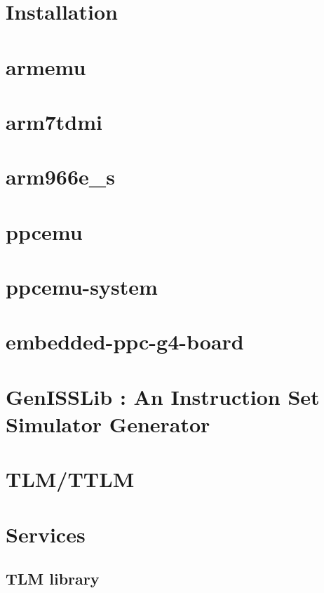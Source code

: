 \documentclass[a4paper,11pt,onecolumn]{mathese}
\begin{document}
\chapter{Installation}
\label{installation}


\chapter{armemu}
\label{armemu}


\chapter{arm7tdmi}
\label{arm7tdmi}


\chapter{arm966e\_s}
\label{arm966e_s}


\chapter{ppcemu}
\label{ppcemu}


\chapter{ppcemu-system}
\label{ppcemu_system}


\chapter{embedded-ppc-g4-board}
\label{embedded_ppc_g4_board}


\chapter{GenISSLib : An Instruction Set Simulator Generator}
\label{genisslib}


\chapter{TLM/TTLM}
\label{tlm_ttlm}


\chapter{Services}
\label{services}


\begin{appendix}
\chapter{TLM library}
\label{tlm_appendix}


\end{appendix}

% 
%  

%
%
\end{document}
